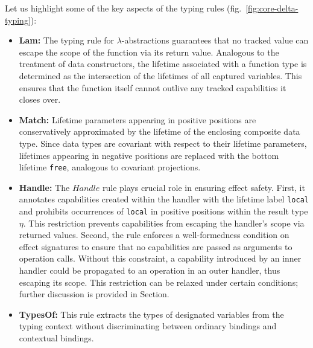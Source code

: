 \documentclass[acmsmall,review,screen]{acmart}
\begin{document}
Let us highlight some of the key aspects of the typing rules (fig.\ \ref{fig:core-delta-typing}):
\begin{itemize} %
    \item \textbf{Lam:} The typing rule for $\lambda$-abstractions guarantees that no tracked value can escape the scope of the function via its return value.
    Analogous to the treatment of data constructors, the lifetime associated with a function type is determined as the intersection of the lifetimes of all captured variables.
    This ensures that the function itself cannot outlive any tracked capabilities it closes over. %
    \item \textbf{Match:} Lifetime parameters appearing in positive positions are conservatively approximated by the lifetime of the enclosing composite data type.
    Since data types are covariant with respect to their lifetime parameters, lifetimes appearing in negative positions are replaced with the bottom lifetime \texttt{free}, analogous to covariant projections. %
    \item \textbf{Handle:} The $Handle$ rule plays crucial role in ensuring effect safety.
    First, it annotates capabilities created within the handler with the lifetime label \texttt{local} and prohibits occurrences of \texttt{local} in positive positions within the result type $\eta$.
    This restriction prevents capabilities from escaping the handler’s scope via returned values.
    Second, the rule enforces a well-formedness condition on effect signatures to ensure that no capabilities are passed as arguments to operation calls. %
    Without this constraint, a capability introduced by an inner handler could be propagated to an operation in an outer handler, thus escaping its scope.
    This restriction can be relaxed under certain conditions; further discussion is provided in Section. %
    \item \textbf{TypesOf:} This rule extracts the types of designated variables from the typing context without discriminating between ordinary bindings and contextual bindings.
\end{itemize}


\end{document}
